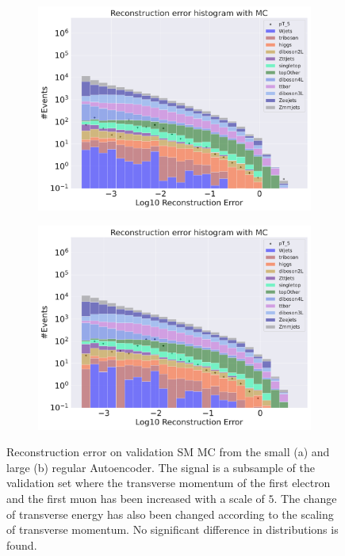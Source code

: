 \begin{figure}[H]
    \centering
    \begin{subfigure}{.45\textwidth}
        \includegraphics[width=\textwidth]{Figures/AE_testing/small/b_data_recon_big_rm3_feats_sig_pT_5.pdf}
        \caption{ }
        \label{fig:ae_small_pt_5}
    \end{subfigure}
    \hfill 
    \begin{subfigure}{.45\textwidth}
        \includegraphics[width=\textwidth]{Figures/AE_testing/big/b_data_recon_big_rm3_feats_sig_pT_5.pdf}
        \caption{}
        \label{fig:ae_big_pt_5}
    \end{subfigure}
    \hfill 
    \caption[AE | Reconstruction error $p_T$ altering of 5]{Reconstruction error on validation SM MC from the small (a) and large (b) regular Autoencoder. The signal is a subsample of the validation 
    set where the transverse momentum of the first electron and the first muon has been increased with a scale of $5$. The change of transverse 
    energy has also been changed according to the scaling of transverse momentum. No significant difference in distributions is found. }
    \label{fig:ae_big_small_pt_5}
\end{figure}


